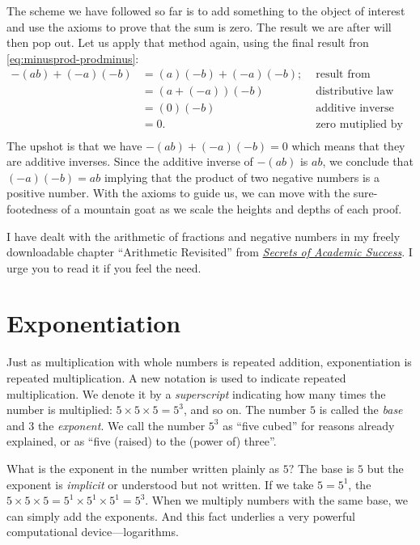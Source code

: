 \documentclass[
  a4paper,
]{article}
\begin{document}
The scheme we have followed so far is to add something to the object of
interest and use the axioms to prove that the sum is zero. The result we
are after will then pop out. Let us apply that method again, using the
final result fron \cref{eq:minusprod-prodminus}: \[
\begin{aligned}
-(ab) + (-a)(-b) &= (a)(-b) + (-a)(-b); & \mbox{ result from previous section}\\
&= (a + (-a))(-b) & \mbox{ distributive law}\\
&= (0)(-b) & \mbox{ additive inverse}\\
&= 0. & \mbox{ zero mutiplied by anything is zero}\\
\end{aligned}
\] The upshot is that we have \(-(ab) + (-a)(-b) = 0\) which means that
they are additive inverses. Since the additive inverse of \(-(ab)\) is
\(ab\), we conclude that \((-a)(-b) = ab\) implying that the product of
two negative numbers is a positive number. With the axioms to guide us,
we can move with the sure-footedness of a mountain goat as we scale the
heights and depths of each proof.

I have dealt with the arithmetic of fractions and negative numbers in my
freely downloadable chapter ``Arithmetic Revisited'' from
\href{https://swanlotus.netlify.app/sas-manuscript/SAS-partial.pdf}{\emph{Secrets
of Academic Success}}. I urge you to read it if you feel the need.

\hypertarget{exponentiation}{%
\section{Exponentiation}\label{exponentiation}}

Just as multiplication with whole numbers is repeated addition,
exponentiation is repeated multiplication. A new notation is used to
indicate repeated multiplication. We denote it by a \emph{superscript}
indicating how many times the number is multiplied:
\(5 \times 5 \times 5 = 5^{3}\), and so on. The number \(5\) is called
the \emph{base} and \(3\) the \emph{exponent}. We call the number
\(5^{3}\) as ``five cubed'' for reasons already explained, or as ``five
(raised) to the (power of) three''.

What is the exponent in the number written plainly as \(5?\) The base is
\(5\) but the exponent is \emph{implicit} or understood but not written.
If we take \(5 = 5^{1}\), the
\(5 \times 5 \times 5 = 5^{1} \times 5^{1} \times 5^{1} = 5^{3}\). When
we multiply numbers with the same base, we can simply add the exponents.
And this fact underlies a very powerful computational
device---logarithms.
\end{document}
